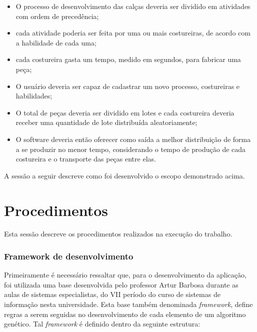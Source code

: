 \begin{itemize}
	
	\item O processo de desenvolvimento das calças deveria ser dividido em atividades com 
	ordem de precedência;
	
	\item cada atividade poderia ser feita por uma ou mais costureiras, de acordo com a habilidade de cada uma;
	
	\item cada costureira gasta um tempo, medido em segundos, para fabricar uma peça;
	
	\item O usuário deveria ser capaz de cadastrar um novo processo, costureiras e habilidades;
	
	\item O total de peças deveria ser dividido em lotes e cada costureira deveria receber uma quantidade de lote
	distribuída aleatoriamente;
	
	\item O software deveria então oferecer como saída a melhor distribuição de forma a se produzir no menor tempo,
	considerando o tempo de produção de cada costureira e o transporte das peças entre elas.
	
\end{itemize}

\par A sessão a seguir descreve como foi desenvolvido o escopo demonstrado acima.



\section{Procedimentos}

\par Esta sessão descreve os procedimentos realizados na execução do trabalho.

\subsubsection{Framework de desenvolvimento}
\par Primeiramente é necessário ressaltar que, para o desenvolvimento da aplicação, foi utilizada uma base desenvolvida pelo professor Artur Barbosa durante as aulas de sistemas especialistas, do VII período do curso de sistemas de informação nesta universidade.
Esta base também denominada \textit{framework}, define regras a serem seguidas no desenvolvimento de cada elemento
de um algoritmo genético. Tal \textit{framework} é definido dentro da seguinte estrutura:

